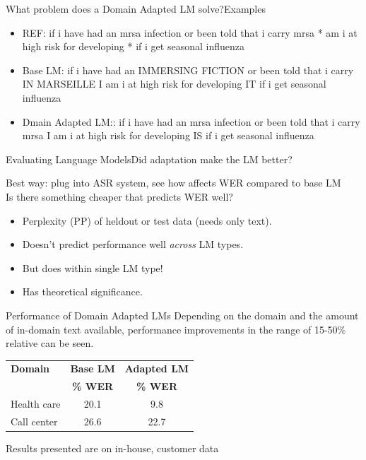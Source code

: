 \begin{frame}{What problem does a Domain Adapted LM solve?}{Examples}

\begin{itemize}
\item {\color{green} REF:  if i have had an {\color{purple} mrsa infection} or been told that i carry {\color{purple} mrsa} *  am i at high risk for developing  *  if i get seasonal influenza}
\item {\color{red} Base LM: if i have had an {\color{purple} IMMERSING FICTION }  or been told that i carry {\color{purple} IN MARSEILLE} I  am i at high risk for developing IT  if i get seasonal influenza}
\item {\color{blue} Dmain Adapted LM::  if i have had an {\color{purple} mrsa infection} or been told that i carry {\color{purple} mrsa} I am i at high risk for developing IS  if i get seasonal influenza }
\end{itemize}
\end{frame}

\begin{frame}{Evaluating Language Models}{Did adaptation make the LM better?}

Best way: plug into ASR system, see how affects WER compared to base LM \\

Is there something cheaper that predicts WER well?
\begin{itemize}
\item {\color{red} {Perplexity} (PP) } of heldout or test data (needs only text).
\item Doesn't predict performance well \emph{across} LM types.
\item But does within single LM type!
\item Has theoretical significance.
\end{itemize}


\end{frame}


\begin{frame}{Performance of Domain Adapted LMs}{}
  Depending on the domain and the amount of in-domain text available, performance improvements in the range of 15-50\% relative can be seen.
  \vfill
  \centering
  \begin{tabular}{@{}lc@{}c@{}} \toprule
    {\bf Domain } &  {\bf Base LM } & {\bf Adapted LM } \\ 
    {\bf   } &  {\bf   \% WER} & {\bf \% WER } \\ \midrule
    Health care & 20.1 & 9.8 \\
    Call center&  26.6 & 22.7 \\ \bottomrule
  \end{tabular}
  \vfill
  \raggedright
  Results  presented are on in-house, customer data
\end{frame}


